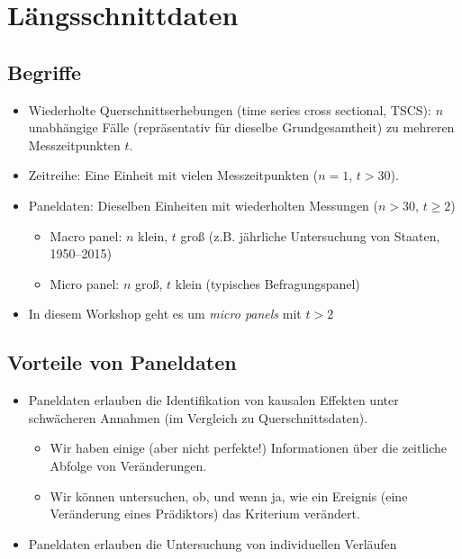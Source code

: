\documentclass[]{book}
\providecommand{\tightlist}{%
  \setlength{\itemsep}{0pt}\setlength{\parskip}{0pt}}
\begin{document}
\hypertarget{luxe4ngsschnittdaten}{%
\section{Längsschnittdaten}\label{luxe4ngsschnittdaten}}

\hypertarget{begriffe}{%
\subsection*{Begriffe}\label{begriffe}}

\begin{itemize}
\tightlist
\item
  Wiederholte Querschnittserhebungen (time series cross sectional, TSCS): \(n\) unabhängige Fälle (repräsentativ für dieselbe Grundgesamtheit) zu mehreren Messzeitpunkten \(t\).
\item
  Zeitreihe: Eine Einheit mit vielen Messzeitpunkten (\(n = 1\), \(t > 30\)).
\item
  Paneldaten: Dieselben Einheiten mit wiederholten Messungen (\(n > 30\), \(t \ge 2\))

  \begin{itemize}
  \tightlist
  \item
    Macro panel: \(n\) klein, \(t\) groß (z.B. jährliche Untersuchung von Staaten, 1950--2015)
  \item
    Micro panel: \(n\) groß, \(t\) klein (typisches Befragungspanel)
  \end{itemize}
\item
  In diesem Workshop geht es um \emph{micro panels} mit \(t > 2\)
\end{itemize}

\hypertarget{vorteile-von-paneldaten}{%
\subsection*{Vorteile von Paneldaten}\label{vorteile-von-paneldaten}}

\begin{itemize}
\tightlist
\item
  Paneldaten erlauben die Identifikation von kausalen Effekten unter schwächeren Annahmen (im Vergleich zu Querschnittsdaten).

  \begin{itemize}
  \tightlist
  \item
    Wir haben einige (aber nicht perfekte!) Informationen über die zeitliche Abfolge von Veränderungen.
  \item
    Wir können untersuchen, ob, und wenn ja, wie ein Ereignis (eine Veränderung eines Prädiktors) das Kriterium verändert.
  \end{itemize}
\item
  Paneldaten erlauben die Untersuchung von individuellen Verläufen
\end{itemize}
\end{document}
